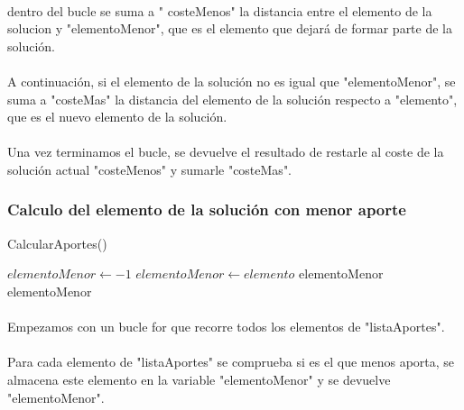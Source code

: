 \documentclass{article}
\begin{document}
	\paragraph{}dentro del bucle se suma a " costeMenos" la distancia entre el elemento de la solucion y "elementoMenor", que es el elemento que dejará de formar parte de la solución.
	
	\paragraph{}A continuación, si el elemento de la solución no es igual que "elementoMenor", se suma a "costeMas" la distancia del elemento de la solución respecto a "elemento", que es el nuevo elemento de la solución. 
	
	\paragraph{}Una vez terminamos el bucle, se devuelve el resultado de restarle al coste de la solución actual "costeMenos" y sumarle "costeMas".
	
	\subsubsection{Calculo del elemento de la solución con menor aporte}
	
	\begin{algorithm}[H]
		\caption{CalcularAportes()}
		\begin{algorithmic}
			\STATE $elementoMenor \leftarrow -1$
			\STATE $elementoMenor \leftarrow elemento$
			\RETURN elementoMenor
			\ENDIF
			\ENDFOR
			\RETURN elementoMenor
		\end{algorithmic}
	\end{algorithm}
	
	\paragraph{}Empezamos con un bucle for que recorre todos los elementos de "listaAportes".
	
	\paragraph{}Para cada elemento de "listaAportes" se comprueba si es el que menos aporta, se almacena este elemento en la variable "elementoMenor" y se devuelve "elementoMenor".
	
\end{document}

